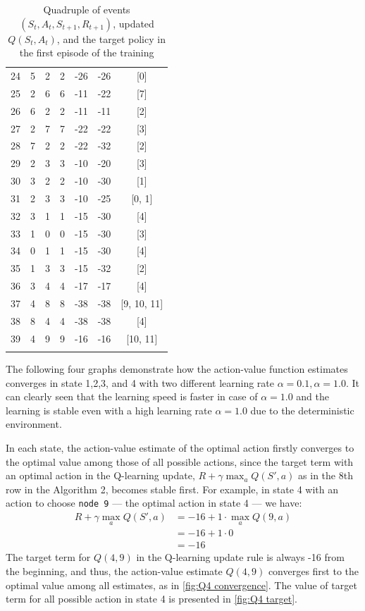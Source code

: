 \begin{table}[!htbp]
\begin{adjustbox}{totalheight = \baselineskip, center}
\begin{tabular}{@{\extracolsep{5pt}} ccccccc}
24 & 5 & 2 & 2 & -26 & -26 & [0] \\
25 & 2 & 6 & 6 & -11 & -22 & [7] \\
26 & 6 & 2 & 2 & -11 & -11 & [2] \\
27 & 2 & 7 & 7 & -22 & -22 & [3] \\
28 & 7 & 2 & 2 & -22 & -32 & [2]  \\
29 & 2 & 3 & 3 & -10 & -20 & [3]  \\
30 & 3 & 2 & 2 & -10 & -30 & [1] \\
31 & 2 & 3 & 3 & -10 & -25 & [0, 1]  \\
32 & 3 & 1 & 1 & -15 & -30 & [4] \\
33 & 1 & 0 & 0 & -15 & -30 & [3] \\
34 & 0 & 1 & 1 & -15 & -30 & [4]  \\
35 & 1 & 3 & 3 & -15 & -32 & [2] \\
36 & 3 & 4 & 4 & -17 & -17 & [4] \\
37 & 4 & 8 & 8 & -38 & -38 & [9, 10, 11]  \\
38 & 8 & 4 & 4 & -38 & -38 & [4] \\
39 & 4 & 9 & 9 & -16 & -16 & [10, 11]  \\
\hline \\[-1.8ex] 
\end{tabular}
\end{adjustbox}
  \caption{Quadruple of events $(S_t, A_t, S_{t+1}, R_{t+1})$, updated $Q(S_t, A_t)$, and the target policy in the first episode of the training}
  \label{tab:the first episode} 
\end{table} 

The following four graphs demonstrate how the action-value function estimates converges in state 1,2,3, and 4 with two different learning rate $\alpha = 0.1, \alpha = 1.0$. It can clearly seen that the learning speed is faster in case of $\alpha=1.0$ and the learning is stable even with a high learning rate $\alpha = 1.0$ due to the deterministic environment.

In each state, the action-value estimate of the optimal action firstly converges to the optimal value among those of all possible actions, since the target term with an optimal action in the Q-learning update, $R + \gamma \max_a Q(S', a)$ as in the 8th row in the Algorithm 2, becomes stable first. For example, in state 4 with an action to choose \texttt{node 9} --- the optimal action in state 4 --- we have:
\begin{align*}
    R + \gamma \max_a Q(S', a) &= -16 + 1 \cdot \max_a Q(9, a)\\
    &= -16 + 1 \cdot 0\\
    &= -16
\end{align*}
The target term for $Q(4,9)$ in the Q-learning update rule is always -16 from the beginning, and thus, the action-value estimate $Q(4,9)$ converges first to the optimal value among all estimates, as in \autoref{fig:Q4 convergence}. The value of target term for all possible action in state 4 is presented in \autoref{fig:Q4 target}.

